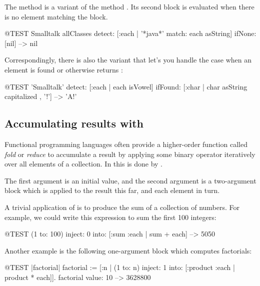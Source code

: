 \documentclass[a4paper,10pt,twoside]{book}
\begin{document}

The method  is a variant of the method .
Its second block is evaluated when there is no element matching the block.

\begin{code}{@TEST}
Smalltalk allClasses detect: [:each | '*java*' match: each asString] ifNone: [nil] --> nil
\end{code}

Correspondingly, there is also the variant  that let's you handle the case when an element is found or otherwise returns :

\begin{code}{@TEST}
'Smalltalk' detect: [:each | each isVowel] ifFound: [:char | char asString capitalized , '!'] --> 'A!'
\end{code}

\subsection{Accumulating results with }
Functional programming languages often provide a higher-order function called \emph{fold} or \emph{reduce} to accumulate a result by applying some binary operator iteratively over all elements of a collection.
In \sq this is done by .

The first argument is an initial value, and the second argument is a two-argument block which is applied to the result this far, and each element in turn.

A trivial application of  is to produce the sum of a collection of numbers.
For example, we could write this expression to sum the first 100 integers:
\begin{code}{@TEST}
(1 to: 100) inject: 0 into: [:sum :each | sum + each] --> 5050
\end{code}

Another example is the following one-argument block which computes factorials:
\begin{code}{@TEST |factorial|}
factorial := [:n | (1 to: n) inject: 1 into: [:product :each | product * each]].
factorial value: 10 --> 3628800
\end{code}
\end{document}
